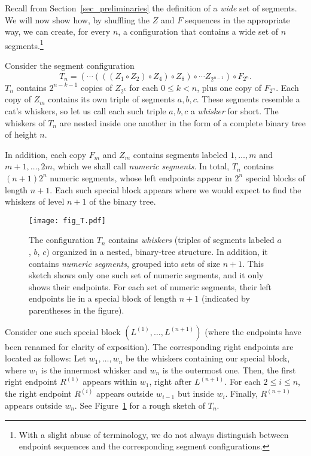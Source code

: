 \documentclass[11pt]{article}
\theoremstyle{definition}
\theoremstyle{remark}
\begin{document}
Recall from Section~\ref{sec_preliminaries} the definition of a \emph{wide} set of segments. We will now show how, by shuffling the $Z$ and $F$ sequences in the appropriate way, we can create, for every $n$, a configuration that contains a wide set of $n$ segments.\footnote{With a slight abuse of terminology, we do not always distinguish between endpoint sequences and the corresponding segment configurations.}

Consider the segment configuration
\begin{equation*}
T_n = (\cdots (((Z_1 \circ Z_2)\circ Z_4)\circ Z_8)\circ \cdots Z_{2^{n-1}})\circ F_{2^n}.
\end{equation*}
$T_n$ contains $2^{n-k-1}$ copies of $Z_{2^k}$ for each $0\le k<n$, plus one copy of $F_{2^n}$. Each copy of $Z_m$ contains its own triple of segments $a,b,c$. These segments resemble a cat's whiskers, so let us call each such triple $a,b,c$ a \emph{whisker} for short. The whiskers of $T_n$ are nested inside one another in the form of a complete binary tree of height $n$.

In addition, each copy $F_m$ and $Z_m$ contains segments labeled $1,\ldots, m$ and $m+1,\ldots,2m$, which we shall call \emph{numeric segments}. In total, $T_n$ contains $(n+1) 2^n$ numeric segments, whose left endpoints appear in $2^n$ special blocks of length $n+1$. Each such special block appears where we would expect to find the whiskers of level $n+1$ of the binary tree.

\begin{figure}
\centerline{\texttt{[image: fig\_T.pdf]}}
\caption{\label{fig_T}The configuration $T_n$ contains \emph{whiskers} (triples of segments labeled $a$, $b$, $c$) organized in a nested, binary-tree structure. In addition, it contains \emph{numeric segments}, grouped into sets of size $n+1$. This sketch shows only one such set of numeric segments, and it only shows their endpoints. For each set of numeric segments, their left endpoints lie in a special block of length $n+1$ (indicated by parentheses in the figure).}
\end{figure}

Consider one such special block $(L^{(1)}, \ldots, L^{(n+1)})$ (where the endpoints have been renamed for clarity of exposition). The corresponding right endpoints are located as follows: Let $w_1, \ldots, w_n$ be the whiskers containing our special block, where $w_1$ is the innermost whisker and $w_n$ is the outermost one. Then, the first right endpoint $R^{(1)}$ appears within $w_1$, right after $L^{(n+1)}$. For each $2\le i\le n$, the right endpoint $R^{(i)}$ appears outside $w_{i-1}$ but inside $w_i$. Finally, $R^{(n+1)}$ appears outside $w_n$. See Figure~\ref{fig_T} for a rough sketch of $T_n$.
\end{document}
